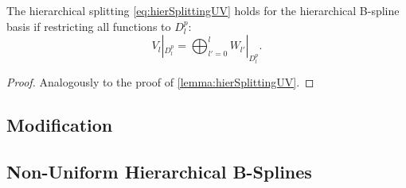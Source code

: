 \begin{corollary}
  The hierarchical splitting \eqref{eq:hierSplittingUV}
  holds for the hierarchical B-spline basis
  if restricting all functions to $D_l^p$:
  \begin{equation}
    V_l|_{D_l^p}
    = \bigoplus_{l'=0}^l W_{l'}|_{D_l^p}.
  \end{equation}
\end{corollary}

\begin{proof}
  Analogously to the proof of \cref{lemma:hierSplittingUV}.
\end{proof}

\subsection{Modification}











































\blindtext{}

\subsection{Non-Uniform Hierarchical B-Splines}


\blindtext{}
